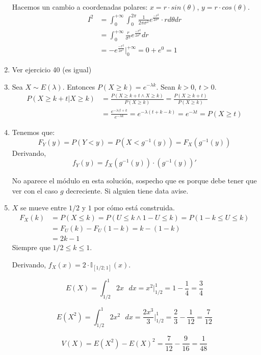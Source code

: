 \begin{enumerate}
		Hacemos un cambio a coordenadas polares: $x = r\cdot sin(\theta)$, $y = r\cdot cos(\theta)$.
		\begin{align*}
			I^2	& = \int_{0}^{+\infty} \int_{0}^{2\pi} \frac{1}{2\pi \sigma^2} e^{\frac{-r^2}{2\sigma^2}}\cdot r d\theta dr	\\
				& = \int_{0}^{+\infty} \frac{r}{\sigma^2} e^{\frac{-r^2}{2\sigma^2}} dr										\\
				& =  -e^{\frac{-r^2}{2\sigma^2}}\Big|_{0}^{+\infty} = 0 + e^0 = 1
		\end{align*}
	\item
		Ver ejercicio 40 (es igual)
	\item
		Sea $X\sim E(\lambda)$. Entonces $P(X \geq k) = e^{-\lambda k}$.
		Sean $k>0$, $t>0$.
		\begin{align*}
			P(X \geq k+t | X\geq k)	& = \frac{P(X \geq k+t \land X\geq k)}{P(X\geq k)} = \frac{P(X \geq k+t)}{P(X\geq k)}	\\
									& = \frac{e^{-\lambda (t+k}}{e^{-\lambda k}} = e^{-\lambda (t+k-k)} = e^{-\lambda t} = P(X \geq t)
		\end{align*}
	\item
		Tenemos que:
		$$F_Y(y) = P(Y < y) =  P(X < g^{-1}(y)) = F_X(g^{-1}(y))$$
		Derivando,
		$$f_Y(y) = f_X(g^{-1}(y))\cdot (g^{-1}(y))'$$
		
		No aparece el módulo en esta solución, sospecho que es porque debe tener que ver con el caso $g$ decreciente.
		Si alguien tiene data avise.
	\item
		$X$ se mueve entre $1/2$ y $1$ por cómo está construida.
		\begin{align*}
			F_X(k)	& = P(X \leq k) = P(U\leq k \land 1-U\leq k) = P(1-k \leq U \leq k)	\\
					& = F_U(k) - F_U(1-k) = k - (1-k)									\\
					& = 2k - 1
		\end{align*}
		Siempre que $1/2\leq k\leq 1$.
		
		Derivando, $f_X(x) = 2\cdot \mathbb{I}_{[1/2; 1]}(x)$.
		
		$$E(X) = \int_{1/2}^{1} 2x\text{ }dx = x^2\Big|_{1/2}^{1} = 1-\frac{1}{4} = \frac{3}{4}$$
		
		$$E(X^2) = \int_{1/2}^{1} 2x^2\text{ }dx = \frac{2x^3}{3}\Big|_{1/2}^{1} = \frac{2}{3} - \frac{1}{12} = \frac{7}{12}$$
		
		$$V(X) = E(X^2) - E(X)^2 = \frac{7}{12} - \frac{9}{16} = \frac{1}{48}$$
\end{enumerate}

